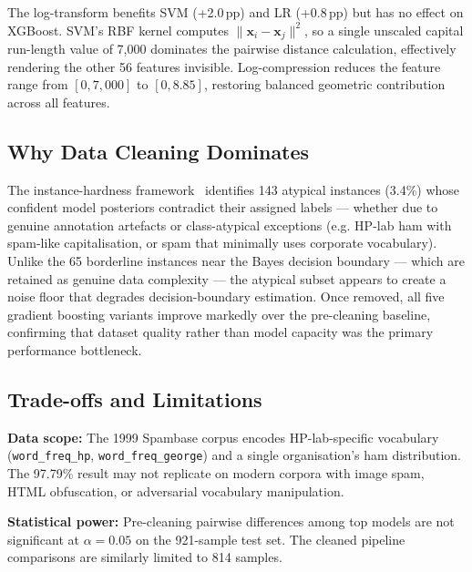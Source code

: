 \documentclass[conference]{IEEEtran}
\begin{document}
The log-transform benefits SVM (+2.0\,pp) and LR (+0.8\,pp)
but has no effect on XGBoost.
SVM's RBF kernel computes $\|{\mathbf{x}_i-\mathbf{x}_j}\|^2$,
so a single unscaled capital run-length value of 7,000 dominates
the pairwise distance calculation, effectively rendering the
other 56 features invisible. Log-compression reduces the feature
range from $[0,7,000]$ to $[0,8.85]$, restoring balanced
geometric contribution across all features.

\subsection{Why Data Cleaning Dominates}

The instance-hardness framework~\cite{ref15} identifies 143
atypical instances (3.4\%) whose confident model posteriors
contradict their assigned labels --- whether due to genuine
annotation artefacts or class-atypical exceptions (e.g.
HP-lab ham with spam-like capitalisation, or spam that
minimally uses corporate vocabulary). Unlike the 65 borderline
instances near the Bayes decision boundary --- which are
retained as genuine data complexity --- the atypical subset
appears to create a noise floor that degrades decision-boundary
estimation. Once removed, all five gradient boosting variants
improve markedly over the pre-cleaning baseline, confirming
that dataset quality rather than model capacity was the
primary performance bottleneck.

\subsection{Trade-offs and Limitations}

\textbf{Data scope:} The 1999 Spambase corpus encodes
HP-lab-specific vocabulary (\texttt{word\_freq\_hp},
\texttt{word\_freq\_george}) and a single organisation's ham
distribution. The 97.79\% result may not replicate on modern
corpora with image spam, HTML obfuscation, or adversarial
vocabulary manipulation.

\textbf{Statistical power:} Pre-cleaning pairwise differences
among top models are not significant at $\alpha=0.05$ on the
921-sample test set. The cleaned pipeline comparisons are
similarly limited to 814 samples.
\end{document}
